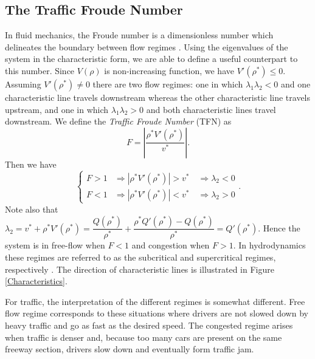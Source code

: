 \documentclass[5p,twocolumn]{elsarticle}
\begin{document}
\subsection{The Traffic Froude Number}
In fluid mechanics, the Froude number is a dimensionless number which delineates the boundary between flow regimes \cite{Sturm, litrico2009modeling}. Using the eigenvalues of the system in the characteristic form, we are able to define a useful counterpart to this number.
Since $V(\rho)$ is non-increasing function, we have $V'(\rho^*) \leq 0$. Assuming $V'(\rho^*) \neq 0$ there are two flow regimes: one in which $\lambda_1 \lambda_2 < 0$ and one characteristic line travels downstream whereas the other characteristic line travels upstream, and one in which $\lambda_1 \lambda_2 > 0$ and both characteristic lines travel downstream. We define the \textit{Traffic Froude Number} (TFN) as
\begin{equation}
F = \left\lvert\dfrac{\rho^*V'( \rho^*)}{v^*}\right\rvert.
\end{equation}
Then we have
\begin{equation*}
\begin{cases}
F > 1 &\Rightarrow |\rho^*V'(\rho^*)| > v^* \quad \Rightarrow \lambda_2  <0 \\
F < 1 &\Rightarrow |\rho^*V'(\rho^*)| < v^* \quad \Rightarrow \lambda_2 > 0
\end{cases}.
\end{equation*}
Note also that $\lambda_2 = v^* + \rho^* V'( \rho^*) = \dfrac{Q(\rho^*)}{\rho^*} + \dfrac{\rho^*Q'(\rho^*)-Q(\rho^*)}{\rho^*} = Q'(\rho^*)$. Hence the system is in free-flow when $F<1$ and congestion when $F>1$. In hydrodynamics these regimes are referred to as the subcritical and supercritical regimes, respectively \cite{litrico2009modeling}. The direction of characteristic lines is illustrated in Figure \ref{Characteristics}.

For traffic, the interpretation of the different regimes is somewhat different. Free flow regime corresponds to these situations where drivers are not slowed down by heavy traffic and go as fast as the desired speed. The congested regime arises when traffic is denser and, because too many cars are present on the same freeway section, drivers slow down and eventually form traffic jam.
\end{document}
